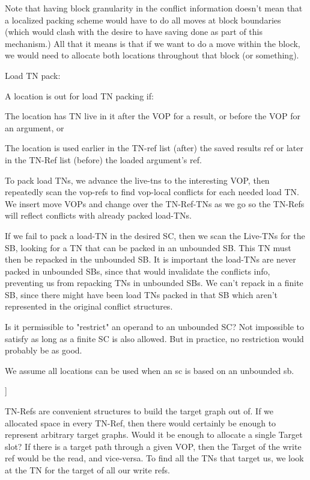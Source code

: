 Note that having block granularity in the conflict information doesn't mean
that a localized packing scheme would have to do all moves at block boundaries
(which would clash with the desire to have saving done as part of this
mechanism.)  All that it means is that if we want to do a move within the
block, we would need to allocate both locations throughout that block (or
something).





Load TN pack:

A location is out for load TN packing if: 

The location has TN live in it after the VOP for a result, or before the VOP
for an argument, or

The location is used earlier in the TN-ref list (after) the saved results ref
or later in the TN-Ref list (before) the loaded argument's ref.

To pack load TNs, we advance the live-tns to the interesting VOP, then
repeatedly scan the vop-refs to find vop-local conflicts for each needed load
TN.  We insert move VOPs and change over the TN-Ref-TNs as we go so the TN-Refs
will reflect conflicts with already packed load-TNs.

If we fail to pack a load-TN in the desired SC, then we scan the Live-TNs for
the SB, looking for a TN that can be packed in an unbounded SB.  This TN must
then be repacked in the unbounded SB.  It is important the load-TNs are never
packed in unbounded SBs, since that would invalidate the conflicts info,
preventing us from repacking TNs in unbounded SBs.  We can't repack in a finite
SB, since there might have been load TNs packed in that SB which aren't
represented in the original conflict structures.

Is it permissible to "restrict" an operand to an unbounded SC?  Not impossible
to satisfy as long as a finite SC is also allowed.  But in practice, no
restriction would probably be as good.

We assume all locations can be used when an sc is based on an unbounded sb.

]


TN-Refs are convenient structures to build the target graph out of.  If we
allocated space in every TN-Ref, then there would certainly be enough to
represent arbitrary target graphs.  Would it be enough to allocate a single
Target slot?  If there is a target path through a given VOP, then the Target of
the write ref would be the read, and vice-versa.  To find all the TNs that
target us, we look at the TN for the target of all our write refs.

